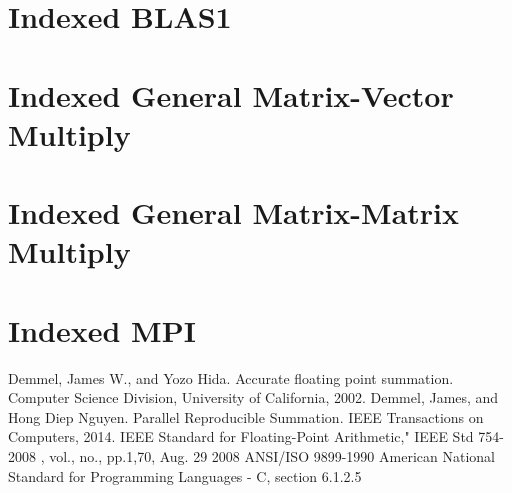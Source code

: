 \documentclass[12pt]{article}
\begin{document}
\section{Indexed BLAS1}
\section{Indexed General Matrix-Vector Multiply}
\section{Indexed General Matrix-Matrix Multiply}
\section{Indexed MPI}
\begin{thebibliography}{9}
    Demmel, James W., and Yozo Hida. Accurate floating point summation. Computer Science Division, University of California, 2002.
    Demmel, James, and Hong Diep Nguyen. Parallel Reproducible Summation. IEEE Transactions on Computers, 2014.
    IEEE Standard for Floating-Point Arithmetic," IEEE Std 754-2008 , vol., no., pp.1,70, Aug. 29 2008
    ANSI/ISO 9899-1990 American National Standard for Programming Languages - C, section 6.1.2.5
\end{thebibliography}
\end{document}
